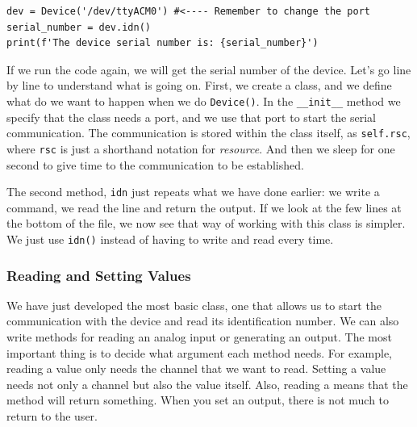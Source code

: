 \begin{verbatim}
dev = Device('/dev/ttyACM0') #<---- Remember to change the port
serial_number = dev.idn()
print(f'The device serial number is: {serial_number}')
\end{verbatim}

If we run the code again, we will get the serial number of the device. Let's go line by line to understand what is going on. First, we create a class, and we define what do we want to happen when we do \texttt{Device()}. In the \texttt{\_\_init\_\_} method we specify that the class needs a port, and we use that port to start the serial communication. The communication is stored within the class itself, as \texttt{self.rsc}, where \texttt{rsc} is just a shorthand notation for \textit{resource}. And then we sleep for one second to give time to the communication to be established. 

The second method, \texttt{idn} just repeats what we have done earlier: we write a command, we read the line and return the output. If we look at the few lines at the bottom of the file, we now see that way of working with this class is simpler. We just use \texttt{idn()} instead of having to write and read every time. 



\subsubsection{Reading and Setting Values}
We have just developed the most basic class, one that allows us to start the communication with the device and read its identification number. We can also write methods for reading an analog input or generating an output. The most important thing is to decide what argument each method needs. For example, reading a value only needs the channel that we want to read. Setting a value needs not only a channel but also the value itself. Also, reading a means that the method will return something. When you set an output, there is not much to return to the user. 

